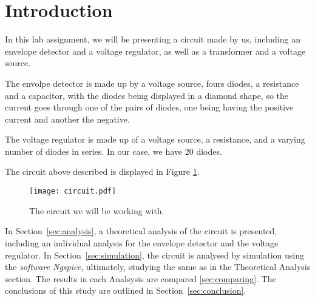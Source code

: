 \newpage
\section{Introduction}
\label{sec:introduction}

In this lab assignment, we will be presenting a circuit made by us, including an envelope detector and a voltage regulator, as well as a transformer and a voltage source.

The envolpe detector is made up by a voltage source, fours diodes, a resistance and a capacitor, with the diodes being displayed in a diamond shape, so the current goes through one of the pairs of diodes, one being having the positive current and another the negative.

The voltage regulator is made up of a voltage source, a resistance, and a varying number of diodes in series. In our case, we have 20 diodes.

The circuit above described is displayed in Figure \ref{fig:circuit}.

\begin{figure}[h] \centering
\texttt{[image: circuit.pdf]}
\caption{The circuit we will be working with.}
\label{fig:circuit}
\end{figure}

In Section~\ref{sec:analysis}, a theoretical analysis of the circuit is
presented, including an individual analysis for the envelope detector and the voltage regulator.
In Section~\ref{sec:simulation}, the circuit is analysed by
simulation using the \textit{software Ngspice}, ultimately, studying the same as in the Theoretical Analysis section.
The results in each Analsysis are compared \ref{sec:comparing}.
The conclusions of this study are outlined in
Section~\ref{sec:conclusion}.
